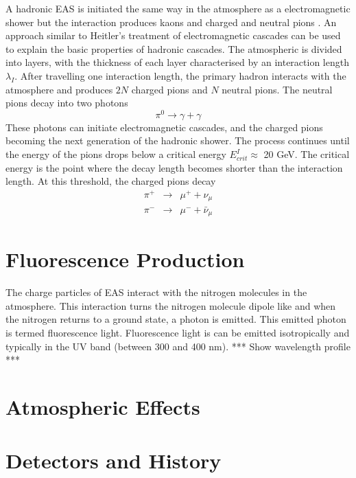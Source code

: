 A hadronic EAS is initiated the same way in the atmosphere as a electromagnetic shower but the interaction produces kaons and charged and neutral pions \cite{kumpel}. An approach similar to Heitler's treatment of electromagnetic cascades can be used to explain the basic properties of hadronic cascades. The atmospheric is divided into layers, with the thickness of each layer characterised by an interaction length $\lambda_I$. After travelling one interaction length, the primary hadron interacts with the atmosphere and produces $2N$ charged pions and $N$ neutral pions. The neutral pions decay into two photons
\begin{equation}
\pi^0 \rightarrow \gamma + \gamma
\end{equation}
These photons can initiate electromagnetic cascades, and the charged pions becoming the next generation of the hadronic shower. The process continues until the energy of the pions drops below a critical energy $E^I_{crit} \approx$ 20 GeV. The critical energy is the point where the decay length becomes shorter than the interaction length. At this threshold, the charged pions decay
\begin{eqnarray}
\pi^+ & \rightarrow & \mu^+ + \nu_{\mu} \\
\pi^- & \rightarrow & \mu^- + \bar{\nu}_{\mu}
\end{eqnarray}

\section{Fluorescence Production}

The charge particles of EAS interact with the nitrogen molecules in the atmosphere. This interaction turns the nitrogen molecule dipole like and when the nitrogen returns to a ground state, a photon is emitted. This emitted photon is termed fluorescence light. Fluorescence light is can be emitted isotropically and typically in the UV band (between 300 and 400 nm). *** Show wavelength profile ***


\section{Atmospheric Effects}




\section{Detectors and History}

